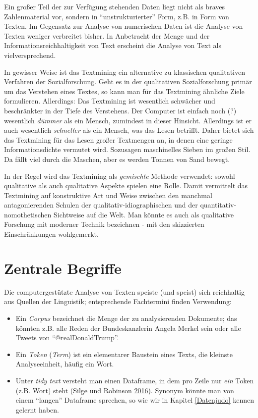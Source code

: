 \documentclass[12pt,ngerman,]{book}
\theoremstyle{definition}
\theoremstyle{definition}
\theoremstyle{remark}
\begin{document}
Ein großer Teil der zur Verfügung stehenden Daten liegt nicht als braves
Zahlenmaterial vor, sondern in ``unstrukturierter'' Form, z.B. in Form
von Texten. Im Gegensatz zur Analyse von numerischen Daten ist die
Analyse von Texten weniger verbreitet bisher. In Anbetracht der Menge
und der Informationsreichhaltigkeit von Text erscheint die Analyse von
Text als vielversprechend.

In gewisser Weise ist das Textmining ein alternative zu klassischen
qualitativen Verfahren der Sozialforschung. Geht es in der qualitativen
Sozialforschung primär um das Verstehen eines Textes, so kann man für
das Textmining ähnliche Ziele formulieren. Allerdings: Das Textmining
ist wesentlich schwächer und beschränkter in der Tiefe des Verstehens.
Der Computer ist einfach noch (?) wesentlich \emph{dümmer} als ein
Mensch, zumindest in dieser Hinsicht. Allerdings ist er auch wesentlich
\emph{schneller} als ein Mensch, was das Lesen betrifft. Daher bietet
sich das Textmining für das Lesen großer Textmengen an, in denen eine
geringe Informationsdichte vermutet wird. Sozusagen maschinelles Sieben
im großen Stil. Da fällt viel durch die Maschen, aber es werden Tonnen
von Sand bewegt.

In der Regel wird das Textmining als \emph{gemischte} Methode verwendet:
sowohl qualitative als auch qualitative Aspekte spielen eine Rolle.
Damit vermittelt das Textmining auf konstruktive Art und Weise zwischen
den manchmal antagonierenden Schulen der qualitativ-idiographischen und
der quantitativ-nomothetischen Sichtweise auf die Welt. Man könnte es
auch als qualitative Forschung mit moderner Technik bezeichnen - mit den
skizzierten Einschränkungen wohlgemerkt.

\section{Zentrale Begriffe}\label{zentrale-begriffe}

Die computergestützte Analyse von Texten speiste (und speist) sich
reichhaltig aus Quellen der Linguistik; entsprechende Fachtermini finden
Verwendung:

\begin{itemize}
\item
  Ein \emph{Corpus} bezeichnet die Menge der zu analysierenden
  Dokumente; das könnten z.B. alle Reden der Bundeskanzlerin Angela
  Merkel sein oder alle Tweets von ``@realDonaldTrump''.
\item
  Ein \emph{Token} (\emph{Term}) ist ein elementarer Baustein eines
  Texts, die kleinste Analyseeinheit, häufig ein Wort.
\item
  Unter \emph{tidy text} versteht man einen Dataframe, in dem pro Zeile
  nur \emph{ein} Token (z.B. Wort) steht (Silge und Robinson
  \protect\hyperlink{ref-Silge2016}{2016}). Synonym könnte man von einem
  ``langen'' Dataframe sprechen, so wie wir in Kapitel \ref{Datenjudo}
  kennen gelernt haben.
\end{itemize}
\end{document}
